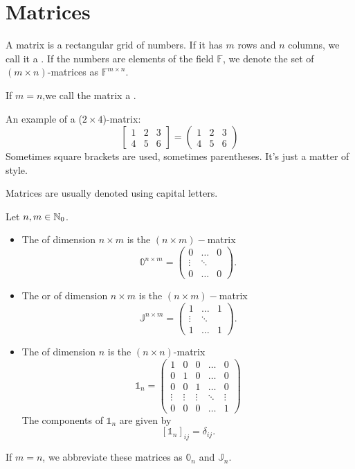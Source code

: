 \section{Matrices}
\begin{definition}
A matrix is a rectangular grid of numbers. If it has $m$ rows and $n$ columns, we call it a .
If the numbers are elements of the field $\mathbb{F}$, we denote the set of $(m\times n)$-matrices as $\mathbb{F}^{m\times n}$.

If $m=n$,we call the matrix a .
\end{definition}
\begin{example}
An example of a ($2\times 4$)-matrix:
\[ \begin{bmatrix}
1 &2 &3\\4 &5&6
\end{bmatrix} = \begin{pmatrix}
1 &2 &3\\4 &5&6
\end{pmatrix} \]
Sometimes square brackets are used, sometimes parentheses. It's just a matter of style.
\end{example}
Matrices are usually denoted using capital letters.

\begin{definition}
Let $n,m\in\mathbb{N}_0$.
\begin{itemize}
\item The  of dimension $n\times m$ is the $(n\times m)-$matrix
\[ \mathbb{0}^{n\times m} = \begin{pmatrix}
0 & \hdots & 0 \\
\vdots & \ddots & \\
0 & \hdots & 0
\end{pmatrix}. \]
\item The  or  of dimension $n\times m$ is the $(n\times m)-$matrix
\[ \mathbb{J}^{n\times m} = \begin{pmatrix}
1 & \hdots & 1 \\
\vdots & \ddots & \\
1 & \hdots & 1
\end{pmatrix}. \]
\item The  of dimension $n$ is the $(n\times n)$-matrix
\[ \mathbb{1}_n = \begin{pmatrix}
1 & 0 & 0 & \hdots & 0\\
0 & 1 & 0 & \hdots & 0\\
0 & 0 & 1 & \hdots & 0\\
\vdots & \vdots & \vdots & \ddots & \vdots \\
0 & 0 & 0 & \hdots & 1
\end{pmatrix} \]
The components of $\mathbb{1}_n$ are given by
\[ [\mathbb{1}_n]_{ij} = \delta_{ij}. \]
\end{itemize}
If $m=n$, we abbreviate these matrices as $\mathbb{0}_n$ and $\mathbb{J}_n$.
\end{definition}

